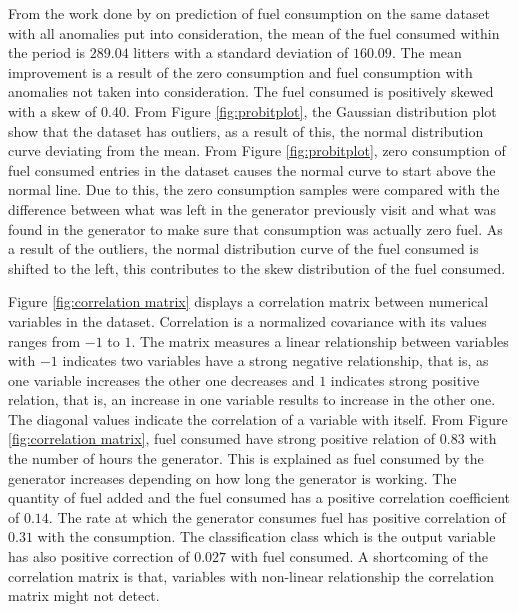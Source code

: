 \documentclass[final,5p,times,twocolumn,authoryear]{elsarticle}
\begin{document}
From the work done by \cite{maxime2018} on prediction of fuel consumption on the same dataset with all anomalies put into consideration, the mean of the fuel consumed within the period is $289.04$ litters with a standard deviation of $160.09$. The mean improvement is a result of the zero consumption and fuel consumption with anomalies  not taken into consideration.
The fuel consumed is positively skewed with a skew of  0.40. From Figure \ref{fig:probitplot}, the Gaussian distribution plot show that the dataset has outliers, as a result of this, the normal distribution curve deviating from the mean. From Figure \ref{fig:probitplot}, zero consumption of fuel consumed entries in the dataset causes the normal curve to start above the normal line. Due to this, the zero consumption samples were compared with the difference between what was left in the generator previously visit and what was found in the generator to make sure that consumption was actually zero fuel. As a result of the outliers, the normal distribution curve of the fuel consumed is shifted to the left, this contributes to the skew distribution of the fuel consumed. 

Figure \ref{fig:correlation matrix} displays a correlation matrix between numerical variables in the dataset. Correlation is a normalized covariance with its values ranges from $-1$ to $1$. The matrix measures a linear relationship between variables with $-1$ indicates two variables have a strong negative relationship, that is, as one variable increases the other one decreases and $1$ indicates strong positive relation, that is, an increase in one variable results to increase in the other one. The diagonal values indicate the correlation of a variable with itself. From Figure \ref{fig:correlation matrix}, fuel consumed have strong positive relation of $0.83$ with the number of hours the generator. This is explained as fuel consumed by the generator increases depending on how long the generator is working. The quantity of fuel added and the fuel consumed has a positive correlation coefficient of $0.14$. The rate at which the generator consumes fuel has positive correlation of $0.31$ with the consumption. The classification class which is the output variable has also positive correction of $0.027$  with fuel consumed. A shortcoming of the correlation matrix is that, variables with non-linear relationship the correlation matrix might not detect. 
\end{document}
